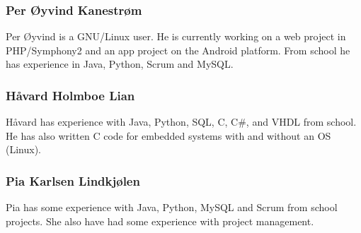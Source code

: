 \subsubsection{Per Øyvind Kanestrøm}
Per Øyvind is a GNU/Linux user. He is currently working on a web project in PHP/Symphony2 and an app project on the Android platform. From school he has experience in Java, Python, Scrum and MySQL.

\subsubsection{Håvard Holmboe Lian}
Håvard has experience with Java, Python, SQL, C, C\#, and VHDL from school. He has also written C code for embedded systems with and without an OS (Linux). 

\subsubsection{Pia	Karlsen	Lindkjølen}
Pia has some experience with Java, Python, MySQL and Scrum from school projects. She also have had some experience with project management. 
